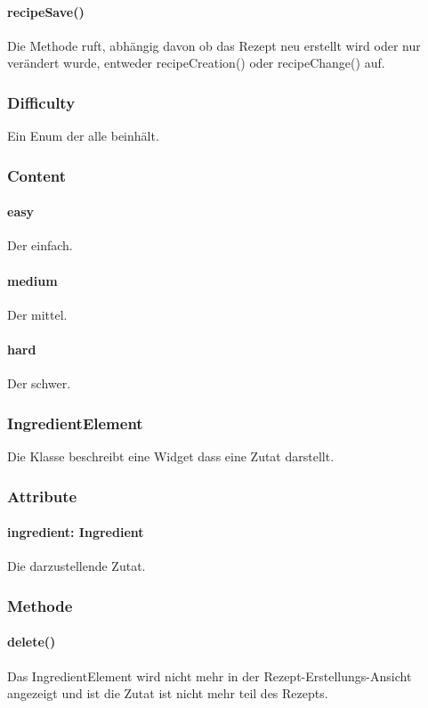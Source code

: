 \documentclass{entwurfsheft}
\begin{document}
\paragraph*{recipeSave()} Die Methode ruft, abhängig davon ob das Rezept neu erstellt wird oder nur verändert wurde, entweder recipeCreation() oder recipeChange() auf.

\subsubsection{Difficulty}\label{sec:Difficulty}
Ein Enum der alle  beinhält.
\subsubsection*{Content}
\paragraph*{easy} Der  einfach.
\paragraph*{medium} Der  mittel.
\paragraph*{hard} Der  schwer.

\subsubsection*{IngredientElement}\label{sec:IngredientElement}
Die Klasse beschreibt eine Widget dass eine Zutat darstellt.
\subsubsection*{Attribute}
\paragraph*{ingredient: Ingredient} Die darzustellende Zutat.

\subsubsection*{Methode}
\paragraph*{delete()} Das IngredientElement wird nicht mehr in der Rezept-Erstellungs-Ansicht angezeigt und ist die Zutat ist nicht mehr teil des Rezepts.
\end{document}
